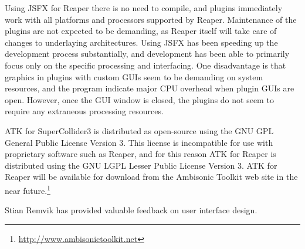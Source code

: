 \documentclass{article}
\begin{document}
Using JSFX for Reaper there is no need to compile, and plugins immediately work with all platforms and processors supported by Reaper.
Maintenance of the plugins are not expected to be demanding, as Reaper itself will take care of changes to underlaying architectures.
Using JSFX has been speeding up the development process substantially, and development has been able to primarily focus only on the specific processing and interfacing.
One disadvantage is that graphics in plugins with custom GUIs seem to be demanding on system resources, and the program indicate major CPU overhead when plugin GUIs are open.
However, once the GUI window is closed, the plugins do not seem to require any extraneous processing resources.

ATK for SuperCollider3 is distributed as open-source using the GNU GPL General Public License Version 3.
This license is incompatible for use with proprietary software such as Reaper, and for this reason ATK for Reaper is distributed using the GNU LGPL Lesser Public License Version 3.
ATK for Reaper will be available for download from the Ambisonic Toolkit web site in the near future.\footnote{\href{http://www.ambisonictoolkit.net}{http://www.ambisonictoolkit.net}}


\begin{acknowledgments}
Stian Remvik has provided valuable feedback on user interface design.
\end{acknowledgments} 


\end{document}
